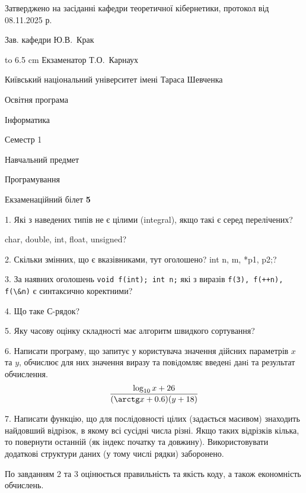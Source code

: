 \documentclass[12pt, ukrainian]{article}
\def\code#1{\Verb!#1!}
\begin{document}
{\smallskip\smallskip \begin {scriptsize} Затверджено на засіданні кафедри теоретичної кібернетики, протокол   від   08.11.2025 р.\par\smallskip\smallskip\smallskip\smallskip
{\parbox {6.5 cm} {Зав. кафедри \dotfill Ю.В.~Крак}}\hspace {0.7cm} {\hbox to 6.5 cm { Екзаменатор \dotfill Т.О.~Карнаух}} \end{scriptsize}}
\newpage
{{\begin {scriptsize}\par
{ \center  Київський національний університет імені Тараса Шевченка \par}
{\parbox {5 cm}{Освітня програма \hfill}{\parbox {7 cm}{Інформатика\hfill}}\parbox {6 cm}{\hfill Семестр 1}}\par
{\parbox {5 cm} {Навчальний предмет \hfill}\parbox {7 cm}{Програмування \hfill}\parbox {6cm}{\hfill}\par}\vspace{-15pt} \end{scriptsize}}{\center Екзаменаційний білет \No \textbf { 5 }\par}}
{%
1. Які з наведених типів не є цілими (integral), якщо такі є серед перелічених?

char, double, int, float, unsigned?
\par
\vspace{2mm}
2. Скільки змінних, що є вказівниками, тут оголошено?
int n, m, *p1, p2;?
\par
\vspace{2mm}
3. За наявних оголошень \code{void f(int); int n;} які з виразів \code{f(3), f(++n), f(\&n)} є синтаксично коректними?
\par
\vspace{2mm}
4. Що таке С-рядок?
\par
\vspace{2mm}
5. Яку часову оцінку складності має алгоритм швидкого сортування?
\par
\vspace{2mm}
6. Написати програму, що запитує у користувача значення дійсних параметрів $x$ та $y$, обчислює для них значення виразу та повiдомляє введенi данi та результат обчислення.
$$\frac{\log_{10} x + 26}{(\arctg x + 0.6) (y + 18)}$$ 

\par
7. Написати функцію, що для послідовності цілих (задається масивом) знаходить найдовший відрізок, в якому всі сусідні числа різні. Якщо таких відрізків кілька, то повернути останній (як індекс початку та довжину). Використовувати додаткові структури даних (у тому числі рядки) заборонено.

По завданням 2 та 3 оцінюється правильність та якість коду, а також економність обчислень.

}
\end{document}
